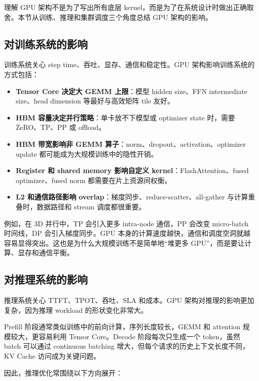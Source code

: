 理解 GPU 架构不是为了写出所有底层 kernel，而是为了在系统设计时做出正确取舍。本节从训练、推理和集群调度三个角度总结 GPU 架构的影响。

\subsection{对训练系统的影响}
\label{subsec:gpu-training-impact}

训练系统关心 step time、吞吐、显存、通信和稳定性。GPU 架构影响训练系统的方式包括：

\begin{itemize}
  \item \textbf{Tensor Core 决定大 GEMM 上限}：模型 hidden size、FFN intermediate size、head dimension 等最好与高效矩阵 tile 友好。
  \item \textbf{HBM 容量决定并行策略}：单卡放不下模型或 optimizer state 时，需要 ZeRO、TP、PP 或 offload。
  \item \textbf{HBM 带宽影响非 GEMM 算子}：norm、dropout、activation、optimizer update 都可能成为大规模训练中的隐性开销。
  \item \textbf{Register 和 shared memory 影响自定义 kernel}：FlashAttention、fused optimizer、fused norm 都需要在片上资源间权衡。
  \item \textbf{L2 和通信路径影响 overlap}：梯度同步、reduce-scatter、all-gather 与计算重叠时，数据路径和 stream 调度都很重要。
\end{itemize}

例如，在 3D 并行中，TP 会引入更多 intra-node 通信，PP 会改变 micro-batch 时间线，DP 会引入梯度同步。GPU 本身的计算速度越快，通信和调度空洞就越容易显得突出。这也是为什么大规模训练不是简单地“堆更多 GPU”，而是要让计算、显存和通信平衡。

\subsection{对推理系统的影响}
\label{subsec:gpu-serving-impact}

推理系统关心 TTFT、TPOT、吞吐、SLA 和成本。GPU 架构对推理的影响更加复杂，因为推理 workload 的形状变化非常大。

Prefill 阶段通常类似训练中的前向计算，序列长度较长，GEMM 和 attention 规模较大，更容易利用 Tensor Core。Decode 阶段每次只生成一个 token，虽然 batch 可以通过 continuous batching 增大，但每个请求的历史上下文长度不同，KV Cache 访问成为关键问题。

因此，推理优化常围绕以下方向展开：

